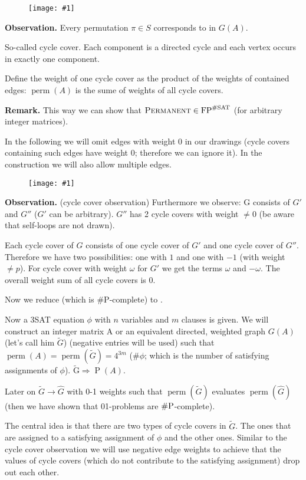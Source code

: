 \documentclass[a4paper]{article}
\newcommand{\drawing}[1]{%
 \begin{figure}[ht]
  \begin{center}
   \texttt{[image: \#1]}
  \end{center}
 \end{figure}
}
\newcommand{\cls}[1]{\rm{#1}}
\newcommand{\probl}[1]{\text{\textsc{#1}}}
\begin{document}
\drawing{graphrepresentation.pdf}

\textbf{Observation.}
  Every permutation $\pi \in S$ corresponds to in $G(A)$.

So-called cycle cover. Each component is a directed cycle and
each vertex occurs in exactly one component.

Define the weight of one cycle cover as the product of the
weights of contained edges: $\operatorname{perm}(A)$ is the
sume of weights of all cycle covers.

\textbf{Remark.}
  This way we can show that $\probl{Permanent} \in
  \cls{FP}^{\cls{\#SAT}}$ (for arbitrary integer matrices).

In the following we will omit edges with weight 0 in our drawings
(cycle covers containing such edges have weight $0$; therefore
we can ignore it).
In the construction we will also allow multiple edges.

\drawing{cycle_cover.pdf}

\textbf{Observation.} (cycle cover observation)
  Furthermore we observe: G consists of $G'$ and $G''$
  ($G'$ can be arbitrary). $G''$ has 2 cycle covers with weight
  $\neq 0$ (be aware that self-loops are not drawn).

Each cycle cover of $G$ consists of one cycle cover of $G'$
and one cycle cover of $G''$. Therefore we have two possibilities:
one with $1$ and one with $-1$ (with weight $\neq p$).
For cycle cover with weight $\omega$ for $G'$ we get the
terms $\omega$ and $-\omega$. The overall weight sum of all
cycle covers is $0$.

Now we reduce \probl{\#3SAT} (which is \cls{\#P}-complete)
to \probl{Permanent}.

Now a 3SAT equation $\phi$ with $n$ variables and $m$ clauses
is given. We will construct an integer matrix A or an equivalent
directed, weighted graph $G(A)$ (let's call him $\tilde{G}$)
(negative entries will be used) such that $\operatorname{perm}(A)
= \operatorname{perm}(\tilde{G}) = 4^{3m}$ ($\#\phi$; which is
the number of satisfying assignments of $\phi$).
$\operatorname{\tilde{G}} \Rightarrow \operatorname{P}(A)$.

Later on $\tilde{G} \rightarrow \hat{G}$ with 0-1 weights such that
$\operatorname{perm}(\tilde{G})$ evaluates $\operatorname{perm}(\hat{G})$
(then we have shown that 01-problems are $\cls{\#P}$-complete).

The central idea is that there are two types of cycle covers in
$\tilde{G}$. The ones that are assigned to a satisfying assignment
of $\phi$ and the other ones.
Similar to the cycle cover observation we will use negative edge
weights to achieve that the values of cycle covers (which do not
contribute to the satisfying assignment) drop out each other.
\end{document}
